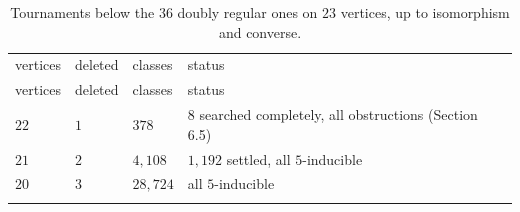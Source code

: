 \documentclass[
]{article}
\begin{document}
\begin{longtable}[]{@{}
  >{\raggedleft\arraybackslash}p{}
  >{\raggedleft\arraybackslash}p{}
  >{\raggedleft\arraybackslash}p{}
  >{\raggedright\arraybackslash}p{}@{}}
\caption{Tournaments below the \(36\) doubly regular ones on \(23\)
vertices, up to isomorphism and converse.}\tabularnewline*
\toprule\noalign{}
\begin{minipage}[b]{\linewidth}\raggedleft
vertices
\end{minipage} & \begin{minipage}[b]{\linewidth}\raggedleft
deleted
\end{minipage} & \begin{minipage}[b]{\linewidth}\raggedleft
classes
\end{minipage} & \begin{minipage}[b]{\linewidth}\raggedright
status
\end{minipage} \\*
\midrule\noalign{}
\endfirsthead
\toprule\noalign{}
\begin{minipage}[b]{\linewidth}\raggedleft
vertices
\end{minipage} & \begin{minipage}[b]{\linewidth}\raggedleft
deleted
\end{minipage} & \begin{minipage}[b]{\linewidth}\raggedleft
classes
\end{minipage} & \begin{minipage}[b]{\linewidth}\raggedright
status
\end{minipage} \\*
\midrule\noalign{}
\endhead
\bottomrule\noalign{}
\endlastfoot
\(22\) & \(1\) & \(378\) & \(8\) searched completely, all obstructions
(Section 6.5) \\*
\(21\) & \(2\) & \(4{,}108\) & \(1{,}192\) settled, all
\(5\)-inducible \\*
\(20\) & \(3\) & \(28{,}724\) & all \(5\)-inducible \\*
\end{longtable}

\end{document}
